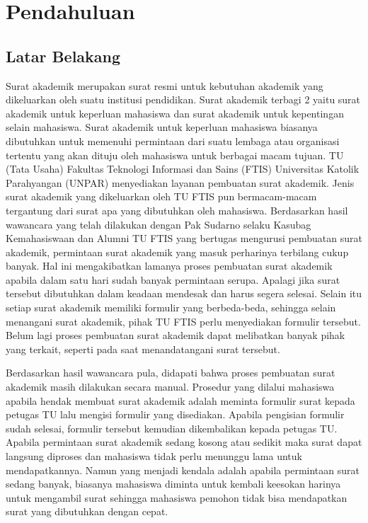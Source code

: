 \chapter{Pendahuluan}
\label{chap:pendahuluan}

\section{Latar Belakang}
\label{sec:latar_belakang}
Surat akademik merupakan surat resmi untuk kebutuhan akademik yang dikeluarkan oleh suatu institusi pendidikan. Surat akademik terbagi 2 yaitu surat akademik untuk keperluan mahasiswa dan surat akademik untuk kepentingan selain mahasiswa. Surat akademik untuk keperluan mahasiswa biasanya dibutuhkan untuk memenuhi permintaan dari suatu lembaga atau organisasi tertentu yang akan dituju oleh mahasiswa untuk berbagai macam tujuan. TU (Tata Usaha) Fakultas Teknologi Informasi dan Sains (FTIS) Universitas Katolik Parahyangan (UNPAR) menyediakan layanan pembuatan surat akademik. Jenis surat akademik yang dikeluarkan oleh TU FTIS pun bermacam-macam tergantung dari surat apa yang dibutuhkan oleh mahasiswa. Berdasarkan hasil wawancara yang telah dilakukan dengan Pak Sudarno selaku Kasubag Kemahasiswaan dan Alumni TU FTIS yang bertugas mengurusi pembuatan surat akademik, permintaan surat akademik yang masuk perharinya terbilang cukup banyak. Hal ini mengakibatkan lamanya proses pembuatan surat akademik apabila dalam satu hari sudah banyak permintaan serupa. Apalagi jika surat tersebut dibutuhkan dalam keadaan mendesak dan harus segera selesai. Selain itu setiap surat akademik memiliki formulir yang berbeda-beda, sehingga selain menangani surat akademik, pihak TU FTIS perlu menyediakan formulir tersebut. Belum lagi proses pembuatan surat akademik dapat melibatkan banyak pihak yang terkait, seperti pada saat menandatangani surat tersebut.  \

Berdasarkan hasil wawancara pula, didapati bahwa proses pembuatan surat akademik masih dilakukan secara manual. Prosedur yang dilalui mahasiswa apabila hendak membuat surat akademik adalah meminta formulir surat kepada petugas TU lalu mengisi formulir yang disediakan. Apabila pengisian formulir sudah selesai, formulir tersebut kemudian dikembalikan kepada petugas TU. Apabila permintaan surat akademik sedang kosong atau sedikit maka surat dapat langsung diproses dan mahasiswa tidak perlu menunggu lama untuk mendapatkannya. Namun yang menjadi kendala adalah apabila permintaan surat sedang banyak, biasanya mahasiswa diminta untuk kembali keesokan harinya untuk mengambil surat sehingga mahasiswa pemohon tidak bisa mendapatkan surat yang dibutuhkan dengan cepat. \

